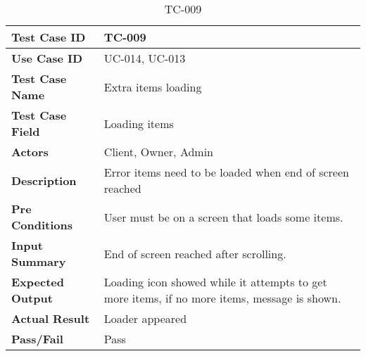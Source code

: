 

\begin{table}[h]
	\centering
	\caption{TC-009}
	\begin{tabular}{ |p{3.8cm}|p{8cm}| }
		\hline
		\textbf{Test Case ID}    & TC-009                                                                                       \\
		\hline
		\textbf{Use Case ID}     & UC-014, UC-013                                                                               \\
		\hline
		\textbf{Test Case Name}  & Extra items loading                                                                          \\
		\hline
		\textbf{Test Case Field} & Loading items                                                                                \\
		\hline
		\textbf{Actors}          & Client, Owner, Admin                                                                         \\
		\hline
		\textbf{Description}     & Error items need to be loaded when end of screen reached                                     \\
		\hline
		\textbf{Pre Conditions}  & User must be on a screen that loads some items.                                              \\
		\hline
		\textbf{Input Summary}   & End of screen reached after scrolling.                                                       \\
		\hline
		\textbf{Expected Output} & Loading icon showed while it attempts to get more items, if no more items, message is shown. \\
		\hline
		\textbf{Actual Result}   & Loader appeared                                                                              \\
		\hline
		\textbf{Pass/Fail}       & Pass                                                                                         \\
		\hline
	\end{tabular}
\end{table}